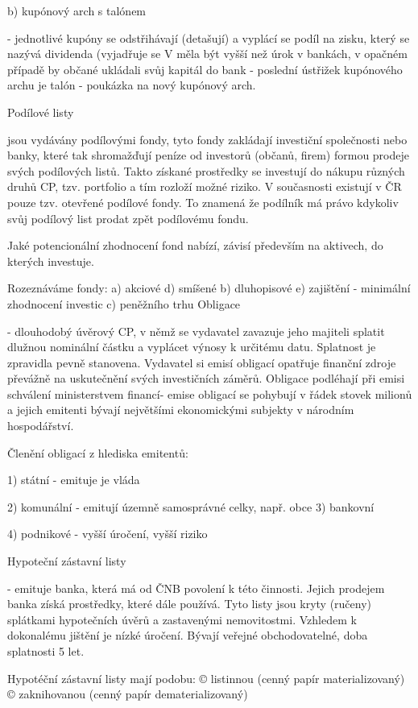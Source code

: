 b) kupónový arch s talónem

- jednotlivé kupóny se odstřihávají (detašují) a vyplácí se podíl na zisku, který se nazývá dividenda (vyjadřuje se V %
měla být vyšší než úrok v bankách, v opačném případě by občané ukládali svůj kapitál do bank - poslední ústřižek
kupónového archu je talón - poukázka na nový kupónový arch.

Podílové listy

jsou vydávány podílovými fondy, tyto fondy zakládají investiční společnosti nebo banky, které tak shromažďují peníze od investorů
(občanů, firem) formou prodeje svých podílových listů. Takto získané prostředky se investují do nákupu různých druhů CP, tzv.
portfolio a tím rozloží možné riziko. V současnosti existují v ČR pouze tzv. otevřené podílové fondy. To znamená že podílník má právo
kdykoliv svůj podílový list prodat zpět podílovému fondu.

Jaké potencionální zhodnocení fond nabízí, závisí především na aktivech, do kterých investuje.

Rozeznáváme fondy: a) akciové d) smíšené
b) dluhopisové e) zajištění - minimální zhodnocení investic
c) peněžního trhu
\newpage
Obligace

- dlouhodobý úvěrový CP, v němž se vydavatel zavazuje jeho majiteli splatit dlužnou nominální částku a vyplácet
výnosy k určitému datu. Splatnost je zpravidla pevně stanovena. Vydavatel si emisí obligací opatřuje finanční zdroje
převážně na uskutečnění svých investičních záměrů. Obligace podléhají při emisi schválení ministerstvem financí-
emise obligací se pohybují v řádek stovek milionů a jejich emitenti bývají největšími ekonomickými subjekty v
národním hospodářství.

Členění obligací z hlediska emitentů:

1) státní - emituje je vláda

2) komunální - emitují územně samosprávné celky, např. obce
3) bankovní

4) podnikové - vyšší úročení, vyšší riziko

Hypoteční zástavní listy

- emituje banka, která má od ČNB povolení k této činnosti. Jejich prodejem banka získá prostředky, které dále používá.
Tyto listy jsou kryty (ručeny) splátkami hypotečních úvěrů a zastavenými nemovitostmi. Vzhledem k dokonalému jištění
je nízké úročení. Bývají veřejné obchodovatelné, doba splatnosti 5 let.

Hypotéční zástavní listy mají podobu:
© listinnou (cenný papír materializovaný)
© zaknihovanou (cenný papír dematerializovaný)

